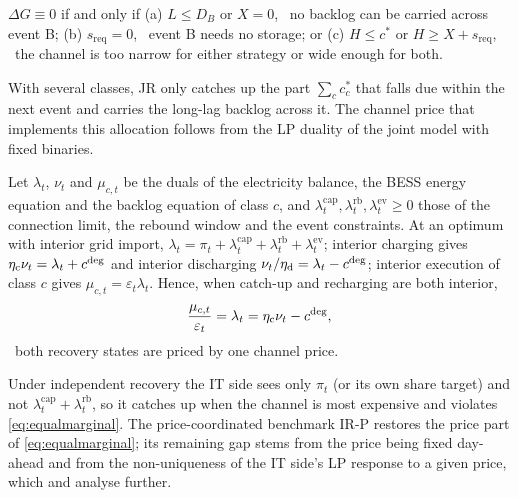 \begin{corollary}\label{cor:novalue}
$\Delta G\equiv0$ if and only if (a) $L\le D_B$ or $X=0$, \ie\ no backlog can be carried across event B; (b)
$s_{\mathrm{req}}=0$, \ie\ event B needs no storage; or (c) $H\le c^*$ or $H\ge X+s_{\mathrm{req}}$, \ie\ the channel is
too narrow for either strategy or wide enough for both.
\end{corollary}

With several classes, JR only catches up the part $\sum_cc_c^*$ that falls due within the next event and carries the
long-lag backlog across it. The channel price that implements this allocation follows from the LP duality of the joint
model with fixed binaries.

\begin{proposition}\label{prop:price}
Let $\lambda_t$, $\nu_t$ and $\mu_{c,t}$ be the duals of the electricity balance, the BESS energy equation and the
backlog equation of class $c$, and $\lambda^{\mathrm{cap}}_t,\lambda^{\mathrm{rb}}_t,\lambda^{\mathrm{ev}}_t\ge0$ those
of the connection limit, the rebound window and the event constraints. At an optimum with interior grid import,
$\lambda_t=\pi_t+\lambda^{\mathrm{cap}}_t+\lambda^{\mathrm{rb}}_t+\lambda^{\mathrm{ev}}_t$; interior charging gives
$\eta_{\mathrm{c}}\nu_t=\lambda_t+c^{\mathrm{deg}}$ and interior discharging $\nu_t/\eta_{\mathrm{d}}=\lambda_t-c^{\mathrm{deg}}$; interior
execution of class $c$ gives $\mu_{c,t}=\varepsilon_t\lambda_t$. Hence, when catch-up and recharging are both interior,
\begin{equation}
\frac{\mu_{c,t}}{\varepsilon_t}=\lambda_t=\eta_{\mathrm{c}}\nu_t-c^{\mathrm{deg}} ,
\label{eq:equalmarginal}
\end{equation}
\ie\ both recovery states are priced by one channel price.
\end{proposition}

Under independent recovery the IT side sees only $\pi_t$ (or its own share target) and not
$\lambda^{\mathrm{cap}}_t+\lambda^{\mathrm{rb}}_t$, so it catches up when the channel is most expensive and violates
\eqref{eq:equalmarginal}. The price-coordinated benchmark IR-P restores the price part of
\eqref{eq:equalmarginal}; its remaining gap stems from the price being fixed day-ahead and from the non-uniqueness of the
IT side's LP response to a given price, which  and  analyse further.
